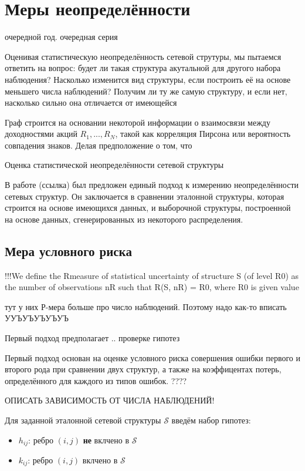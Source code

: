 \section{Меры неопределённости}

очередной год. очередная серия

Оценивая статистическую неопределённость сетевой струтуры, мы пытаемся ответить на вопрос: будет ли такая структура акутальной для другого набора наблюдения? Насколько изменится вид структуры, если построить её на основе меньшего числа наблюдений? Получим ли ту же самую структуру, и если нет, насколько сильно она отличается от имеющейся

Граф строится на основании некоторой информации о взаимосвязи между доходностями акций $R_1, ..., R_N$, такой как корреляция Пирсона или вероятность совпадения знаков. Делая предположение о том, что 

Оценка статистической неопределённости сетевой структуры 

В работе (ссылка) был предложен единый подход к измерению неопределённости сетевых структур. Он заключается в сравнении эталонной структуры, которая строится на основе имеющихся данных, и выборочной структуры, построенной на основе данных, сгенерированных из некоторого распределения. 


\subsection{Мера условного риска}


!!!We define the Rmeasure of statistical uncertainty of structure S (of level R0) as the number
of observations nR such that R(S, nR) = R0, where R0 is given value

тут у них Р-мера больше про число наблюдений. Поэтому надо как-то вписать УУЪУЪУЪУЪУЪ


Первый подход предполагает .. проверке гипотез

Первый подход основан на оценке условного риска совершения ошибки первого и второго рода при сравнении двух структур, а также на коэффицентах потерь, определённого для каждого из типов ошибок.   ????

ОПИСАТЬ ЗАВИСИМОСТЬ ОТ ЧИСЛА НАБЛЮДЕНИЙ!

Для заданной эталонной сетевой структуры $\mathcal{S}$ введём набор гипотез:

\begin{itemize}
	\item $h_{i j}$: ребро $(i,j)$ \textbf{не} вклчено в $\mathcal{S}$
	\item $k_{i j}$: ребро $(i,j)$ вклчено в $\mathcal{S}$
\end{itemize}


